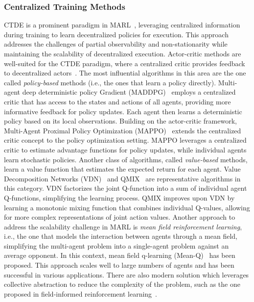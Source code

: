 \documentclass[sigconf]{acmart}
\begin{document}
\subsubsection{Centralized Training Methods} CTDE is a prominent paradigm in MARL~\cite{ning2024survey}, 
leveraging centralized information during training to learn decentralized policies for execution. 
This approach addresses the challenges of partial observability and non-stationarity while maintaining the scalability of decentralized execution. %
Actor-critic methods are well-suited for the CTDE paradigm, 
where a centralized critic provides feedback to decentralized actors~\cite{DBLP:conf/icml/RashidSWFFW18,DBLP:journals/corr/SunehagLGCZJLSL17,yu2022surprising,DBLP:conf/nips/LoweWTHAM17}. 
% 
The most influential algorithms in this area are the one called \emph{policy-based} methods (i.e., the ones that learn a policy directly).
%
Multi-agent deep deterministic policy Gradient (MADDPG)~\cite{DBLP:conf/nips/LoweWTHAM17} employs a centralized critic that has access to the states and actions of all agents, providing more informative feedback for policy updates. 
Each agent then learns a deterministic policy based on its local observations. %
Building on the actor-critic framework, Multi-Agent Proximal Policy Optimization (MAPPO)~\cite{yu2022surprising} extends the centralized critic concept to the policy optimization setting. 
MAPPO leverages a centralized critic to estimate advantage functions for policy updates, while individual agents learn stochastic policies. 
Another class of algorithms, called \emph{value-based} methods, learn a value function that estimates the expected return for each agent.
%
Value Decomposition Networks (VDN)~\cite{DBLP:journals/corr/SunehagLGCZJLSL17} and QMIX~\cite{DBLP:conf/icml/RashidSWFFW18} are representative algorithms in this category. 
VDN factorizes the joint Q-function into a sum of individual agent Q-functions, 
simplifying the learning process. 
QMIX improves upon VDN by learning a monotonic mixing function that combines individual Q-values, 
allowing for more complex representations of joint action values. %
%
Another approach to address the scalability challenge in MARL is \emph{mean field reinforcement learning}, i.e., 
the one that models the interaction between agents through a mean field, simplifying the multi-agent problem into a single-agent problem against an average opponent.
%
In this context, mean field q-learning (Mean-Q)~\cite{DBLP:conf/icml/YangLLZZW18} has been proposed.
This approach scales well to large numbers of agents and has been successful in various applications. 
% 
There are also modern solution which leverages collective abstraction to reduce the complexity of the problem, such as the one proposed in field-informed reinforcement learning~\cite{DBLP:conf/acsos/AguzziVE23}.
\end{document}
